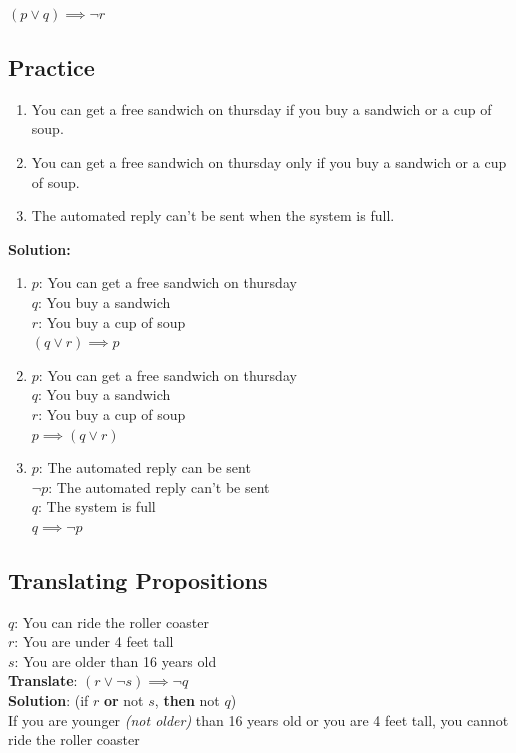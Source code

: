 \documentclass{article}
\begin{document}
$(p \lor q) \implies \neg r$

\subsection{Practice}
\begin{enumerate}
	\item You can get a free sandwich on thursday if you buy a sandwich or a cup of soup.
	\item You can get a free sandwich on thursday only if you buy a sandwich or a cup of soup.
	\item The automated reply can't be sent when the system is full.

\end{enumerate}
\textbf{Solution:}
\begin{enumerate}
	\item $ p $: You can get a free sandwich on thursday \\
		$ q $: You buy a sandwich \\
		$ r $: You buy a cup of soup \\
		$ (q \lor r) \implies p $
	\item $ p $: You can get a free sandwich on thursday \\
		$ q $: You buy a sandwich \\
		$ r $: You buy a cup of soup \\
		$ p \implies (q \lor r) $
	\item $ p $: The automated reply can be sent \\
		$ \neg p $: The automated reply can't be sent \\
		$ q $: The system is full \\
		$ q \implies \neg p $
\end{enumerate}
\subsection{Translating Propositions}
$ q $: You can ride the roller coaster \\
$ r $: You are under 4 feet tall \\
$ s $: You are older than 16 years old \\
\textbf{Translate}: $ (r \lor \neg s) \implies \neg q $ \\


\textbf{Solution}: (if $ r $ \textbf{or} not $ s $, \textbf{then} not $ q $) \\
If you are younger \textit{(not older)} than 16 years old or you are 4 feet tall, you cannot ride the roller coaster 
\clearpage
\end{document}

